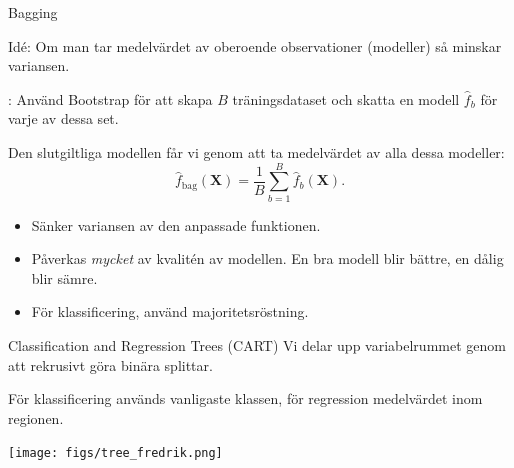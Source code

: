 \documentclass[10pt,english]{beamer}
\begin{document}
\begin{frame}{Bagging}
    
    Idé: Om man tar medelvärdet av oberoende observationer (modeller) så minskar variansen.

    \begin{bluebox}
        : Använd Bootstrap för att skapa $B$ träningsdataset och skatta en modell $\hat{f}_b$ för varje av dessa set.

        Den slutgiltliga modellen får vi genom att ta medelvärdet av alla dessa modeller:
        \begin{equation*}
            \hat{f}_{\text{bag}}(\mathbf{X}) = \frac{1}{B}\sum_{b=1}^{B}\hat{f}_b(\mathbf{X}).
        \end{equation*}
    \end{bluebox}

    \begin{itemize}
        \item Sänker variansen av den anpassade funktionen.
        \item Påverkas \emph{mycket} av kvalitén av modellen. En bra modell blir bättre, en dålig blir sämre.
        \item För klassificering, använd majoritetsröstning.
    \end{itemize}

\end{frame}

\begin{frame}{Classification and Regression Trees (CART)}
    Vi delar upp variabelrummet genom att rekrusivt göra binära splittar.

    För klassificering används vanligaste klassen, för regression medelvärdet inom regionen.

    \texttt{[image: figs/tree\_fredrik.png]}
\end{frame}
\end{document}
